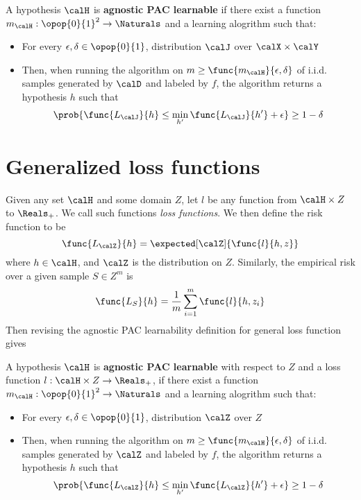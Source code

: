 \begin{definition}
    A hypothesis \(\calH\) is \textbf{agnostic PAC learnable} if there exist a function \(m_{\calH} : \opop{0}{1}^2 \to \Naturals\) and a learning alogrithm such that:
    \begin{itemize}
        \item For every \(\epsilon,\delta \in \opop{0}{1}\), distribution \(\calJ\) over \(\calX \times \calY\)
        \item Then, when running the algorithm on \(m \geq \func{m_{\calH}}{\epsilon,\delta}\) of i.i.d. samples generated by \(\calD\) and labeled by \(f\), the algorithm returns a hypothesis \(h\) such that 
        \begin{equation*}
            \prob{\func{L_{\calJ}}{h} \leq \min_{h'} \func{L_{\calJ}}{h'} + \epsilon} \geq 1- \delta
        \end{equation*}
    \end{itemize}
\end{definition}

\section{Generalized loss functions}
Given any set \(\calH\) and some domain \(Z\), let \(l\) be any function from \(\calH \times Z\) to \(\Reals_+\). We call such functions \textit{loss functions}. We then define the risk function to be
\begin{equation*}
    \func{L_{\calZ}}{h} = \expected[\calZ]{\func{l}{h,z}}
\end{equation*}
where \(h \in \calH\), and \(\calZ\) is the distribution on \(Z\). Similarly, the empirical risk over a given sample \(S \in Z^m\) is 
\begin{equation*}
    \func{L_S}{h} = \dfrac{1}{m} \sum_{i = 1}^m \func{l}{h,z_i}
\end{equation*}
Then revising the agnostic PAC learnability definition for general loss function gives 
\begin{definition}
    A hypothesis \(\calH\) is \textbf{agnostic PAC learnable} with respect to \(Z\) and a loss function \(l:\calH \times Z \to \Reals_+\), if there exist a function \(m_{\calH} : \opop{0}{1}^2 \to \Naturals\) and a learning alogrithm such that:
    \begin{itemize}
        \item For every \(\epsilon,\delta \in \opop{0}{1}\), distribution \(\calZ\) over \(Z\)
        \item Then, when running the algorithm on \(m \geq \func{m_{\calH}}{\epsilon,\delta}\) of i.i.d. samples generated by \(\calZ\) and labeled by \(f\), the algorithm returns a hypothesis \(h\) such that 
        \begin{equation*}
            \prob{\func{L_{\calZ}}{h} \leq \min_{h'} \func{L_{\calZ}}{h'} + \epsilon} \geq 1- \delta
        \end{equation*}
    \end{itemize}
\end{definition}


